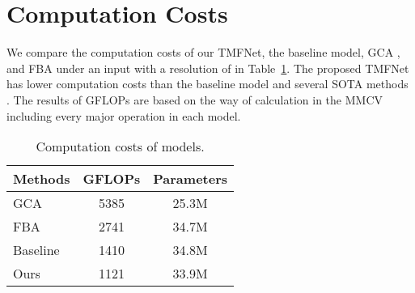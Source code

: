 \documentclass[10pt,twocolumn,letterpaper]{article}
\begin{document}
\section{Computation Costs}
We compare the computation costs of our TMFNet, the baseline model, GCA \cite{gca}, and FBA \cite{fba}  under an input with a resolution of  in Table~\ref{tabsupp:GFLOPs}. The proposed TMFNet  has lower computation costs than the baseline model and several SOTA methods \cite{gca,fba}. The results of GFLOPs are based on the way of calculation in the MMCV  \cite{mmcv} including every major operation in each model.
\begin{table}[h]
    \begin{center}
    \caption{Computation costs of models.}
    \begin{tabular}{l|c|c}
        \hline
        Methods & GFLOPs&Parameters  \\
        \hline
        GCA  \cite{gca} & 5385&25.3M \\
        FBA  \cite{fba} & 2741&34.7M \\
        \hline
        Baseline & 1410&34.8M \\
        Ours & 1121&33.9M\\
        \hline
    \end{tabular}

    \label{tabsupp:GFLOPs}
    \end{center}
\end{table}
\end{document}
